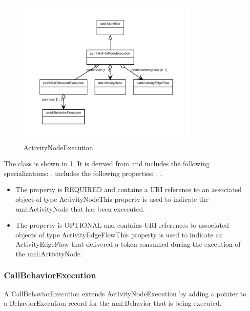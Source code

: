 \begin{figure}[h!]%
\centering%
\includegraphics[width=0.8\textwidth]{paml_classes/ActivityNodeExecution_abstraction_hierarchy.pdf}%
\caption{ActivityNodeExecution}%
\label{fig:ActivityNodeExecution}%
\end{figure}

%
The  class is shown in \ref{fig:ActivityNodeExecution}. It is derived from  and includes the following specializations: . %
 includes the following properties: , . %
\begin{itemize}%
\item%
The  property is REQUIRED and contains a URI reference to an associated object of type ActivityNodeThis property is used to indicate the uml:ActivityNode that has been execcuted.%
\item%
The  property is OPTIONAL and contains URI references to associated objects of type ActivityEdgeFlowThis property is used to indicate an ActivityEdgeFlow that delivered a token consumed during
        the execution of the uml:ActivityNode.%
\end{itemize}%
\subsubsection{CallBehaviorExecution}%
\label{sec:paml:CallBehaviorExecution}%
A CallBehaviorExecution extends ActivityNodeExecution by adding a pointer to a BehaviorExecution
        record for the uml:Behavior that is being executed.

